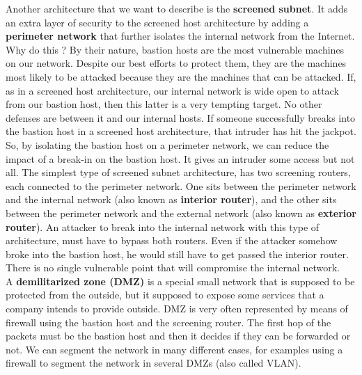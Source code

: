 \documentclass[11pt]{article}
\begin{document}
Another architecture that we want to describe is the \textbf{screened subnet}. It adds an extra layer of security to the screened host architecture by adding a \textbf{perimeter network} that further isolates the internal network from the Internet. Why do this ? By their nature, bastion hosts are the most vulnerable machines on our network. Despite our best efforts to protect them, they are the machines most likely to be attacked because they are the machines that can be attacked. If, as in a screened host architecture, our internal network is wide open to attack from our bastion host, then this latter is a very tempting target. No other defenses are between it and our internal hosts. If someone successfully breaks into the bastion host in a screened host architecture, that intruder has hit the jackpot. So, by isolating the bastion host on a perimeter network, we can reduce the impact of a break-in on the bastion host. It gives an intruder some access but not all. The simplest type of screened subnet architecture, has two screening routers, each connected to the perimeter network. One sits between the perimeter network and the internal network (also known as \textbf{interior router}), and the other sits between the perimeter network and the external network (also known as \textbf{exterior router}). An attacker to break into the internal network with this type of architecture, must have to bypass both routers. Even if the attacker somehow broke into the bastion host, he would still have to get passed the interior router. There is no single vulnerable point that will compromise the internal network.\\A \textbf{demilitarized zone (DMZ)} is a special small network that is supposed to be protected from the outside, but it supposed to expose some services that a company intends to provide outside. DMZ is very often represented by means of firewall using the bastion host and the screening router. The first hop of the packets must be the bastion host and then it decides if they can be forwarded or not. We can segment the network in many different cases, for examples using a firewall to segment the network in several DMZs (also called VLAN).
\end{document}

